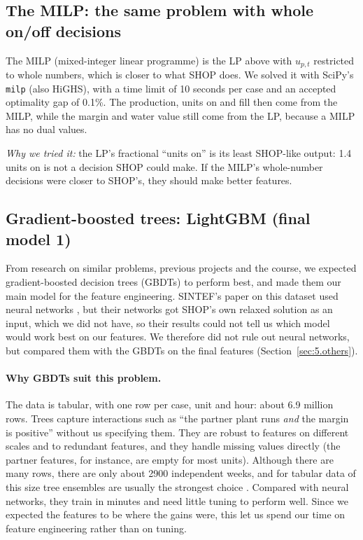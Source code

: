 \subsection{The MILP: the same problem with whole on/off decisions}\label{sec:5.milp}

The MILP (mixed-integer linear programme) is the LP above with $u_{p,t}$ restricted to whole numbers, which is closer to what SHOP does. We solved it with SciPy's \texttt{milp} (also HiGHS), with a time limit of 10 seconds per case and an accepted optimality gap of 0.1\%. The production, units on and fill then come from the MILP, while the margin and water value still come from the LP, because a MILP has no dual values.

\emph{Why we tried it:} the LP's fractional ``units on'' is its least SHOP-like output: 1.4 units on is not a decision SHOP could make. If the MILP's whole-number decisions were closer to SHOP's, they should make better features.

\subsection{Gradient-boosted trees: LightGBM (final model 1)}\label{sec:5.lgbm}

From research on similar problems, previous projects and the course, we expected gradient-boosted decision trees (GBDTs) to perform best, and made them our main model for the feature engineering. SINTEF's paper on this dataset used neural networks \citep{barjaktarevic2026}, but their networks got SHOP's own relaxed solution as an input, which we did not have, so their results could not tell us which model would work best on our features. We therefore did not rule out neural networks, but compared them with the GBDTs on the final features (Section~\ref{sec:5.others}).

\paragraph{Why GBDTs suit this problem.} The data is tabular, with one row per case, unit and hour: about 6.9 million rows. Trees capture interactions such as ``the partner plant runs \emph{and} the margin is positive'' without us specifying them. They are robust to features on different scales and to redundant features, and they handle missing values directly (the partner features, for instance, are empty for most units). Although there are many rows, there are only about 2900 independent weeks, and for tabular data of this size tree ensembles are usually the strongest choice \citep{grinsztajn2022}. Compared with neural networks, they train in minutes and need little tuning to perform well. Since we expected the features to be where the gains were, this let us spend our time on feature engineering rather than on tuning.

